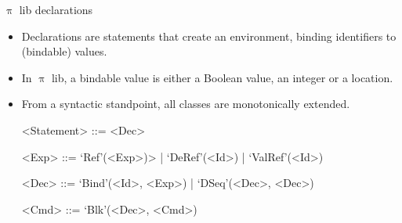 \documentclass{beamer}
\begin{document}

\begin{frame}{{\color{red}$\uppi$ lib} declarations}

\begin{itemize}
\item Declarations are statements that create an environment, binding identifiers to (bindable) values.
\item In {\color{red}$\uppi$ lib}, a bindable value is either a Boolean value, an integer or a location.
\item From a syntactic standpoint, all classes are monotonically extended.
\begin{grammar}
<Statement> ::= <Dec> 

<Exp>       ::= `Ref'(<Exp>)> | `DeRef'(<Id>) | `ValRef'(<Id>)

<Dec>       ::= `Bind'(<Id>, <Exp>) | `DSeq'(<Dec>, <Dec>)

<Cmd>       ::= `Blk'(<Dec>, <Cmd>) 
\end{grammar}
\end{itemize}

\end{frame}

\end{document}
